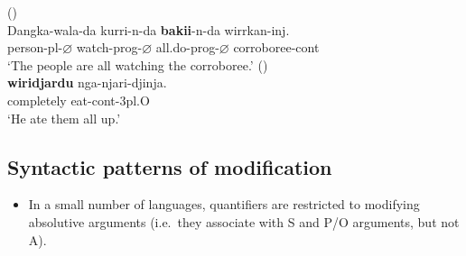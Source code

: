 \documentclass{article}
\begin{document}
\begin{exe}
 (\citealt[464]{round09})\\
\gll Dangka-wala-da kurri-n-da          \textbf{bakii}-n-da         wirrkan-inj. \\
person-{\sc pl}-$\varnothing$       watch-{\sc prog}-$\varnothing$ all.do-{\sc prog}-$\varnothing$ corroboree-{\sc cont}  \\
\glt `The people are all watching the corroboree.'
 (\citealt[54]{sands89})\\
\gll \textbf{wiridjardu}  nga-njari-djinja.\\
 completely  eat-{\sc cont}-3{\sc pl.O}     \\   
\glt `He ate them all up.'
\end{exe}


\subsection{Syntactic patterns of modification
\label{sec:scope}}
\begin{itemize}
\item In a small number of languages, quantifiers are restricted to modifying absolutive arguments (i.e.\ they associate with S and P/O arguments, but not A). %
\end{itemize}
\end{document}
